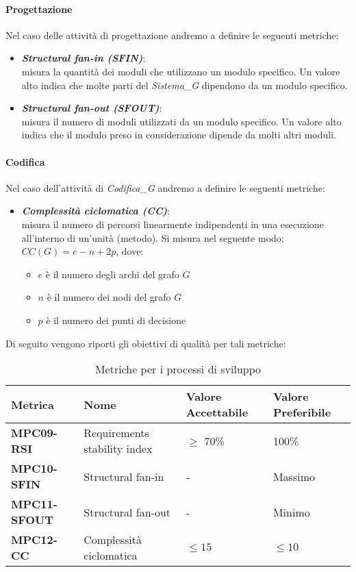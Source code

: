 \paragraph{Progettazione}
Nel caso delle attività di progettazione andremo a definire le seguenti metriche:
\begin{itemize}
    \item \textbf{\emph{Structural fan-in (SFIN)}}:\\
    misura la quantità dei moduli che utilizzano un modulo specifico. Un valore alto indica che molte parti del \textit{Sistema_G} dipendono da un modulo specifico.
    \item \textbf{\emph{Structural fan-out (SFOUT)}}:\\
    misura il numero di moduli utilizzati da un modulo specifico. Un valore alto indica che il modulo preso in considerazione dipende da molti altri moduli.
\end{itemize}

\paragraph{Codifica}
Nel caso dell'attività di \textit{Codifica_G} andremo a definire le seguenti metriche:
\begin{itemize}
    \item \textbf{\emph{Complessità ciclomatica (CC)}}:\\
    misura il numero di percorsi linearmente indipendenti in una esecuzione all'interno di un'unità (metodo). Si misura nel seguente modo:\\
    $CC(G) = e - n +2p$, dove:
    \begin{itemize}
        \item $e$ è il numero degli archi del grafo $G$
        \item $n$ è il numero dei nodi del grafo $G$
        \item $p$ è il numero dei punti di decisione
    \end{itemize}    
\end{itemize}
Di seguito vengono riporti gli obiettivi di qualità per tali metriche:
\begin{table}[htbp]
    \centering
    \begin{tabular}{|>{\centering\arraybackslash}p{3.5cm}|p{4.3cm}|p{4cm}|p{4cm}|}
    \hline
    \rowcolor{gray!30}
    \textbf{Metrica} & \textbf{Nome} & \textbf{Valore Accettabile} & \textbf{Valore Preferibile} \\
    \hline
    \rowcolor{gray!10}
    \textbf{MPC09-RSI} & Requirements stability index & $\geq$ 70\% & 100\% \\
    \hline
    \rowcolor{gray!10}
    \textbf{MPC10-SFIN} & Structural fan-in & - & Massimo \\
    \hline
    \textbf{MPC11-SFOUT} & Structural fan-out & - & Minimo \\
    \hline
    \rowcolor{gray!10}
    \textbf{MPC12-CC} & Complessità ciclomatica & $\leq 15 $ & $\leq 10$ \\
    \hline
    \end{tabular}
    \caption{Metriche per i processi di sviluppo}
    \label{tab:metriche_sviluppo}
\end{table}


